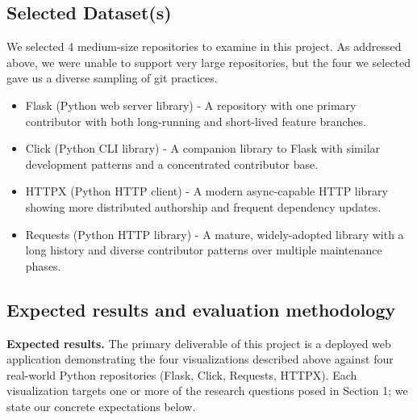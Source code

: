 \documentclass[12 pt]{article}
\begin{document}
\subsection{Selected Dataset(s)}
We selected 4 medium-size repositories to examine in this project. As addressed above,
we were unable to support very large repositories, but the four we selected gave us a
diverse sampling of git practices.
\begin{itemize}
    \item Flask (Python web server library) - A repository with one primary
    contributor with both long-running and short-lived feature branches.
    \item Click (Python CLI library) - A companion library to Flask with similar
    development patterns and a concentrated contributor base.
    \item HTTPX (Python HTTP client) - A modern async-capable HTTP library showing
    more distributed authorship and frequent dependency updates.
    \item Requests (Python HTTP library) - A mature, widely-adopted library with
    a long history and diverse contributor patterns over multiple maintenance phases.
\end{itemize}
\subsection{Expected results and evaluation methodology}

\noindent\textbf{Expected results.}
The primary deliverable of this project is a deployed web application
demonstrating the four visualizations described above against four real-world
Python repositories (Flask, Click, Requests, HTTPX).
Each visualization targets one or more of the research questions posed in
Section 1; we state our concrete expectations below.
\end{document}
